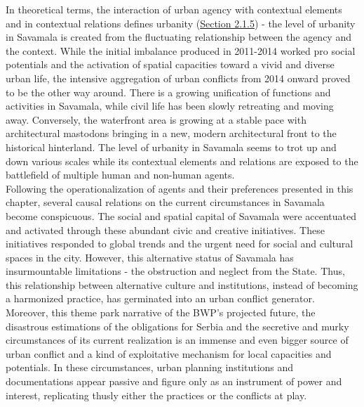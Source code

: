 \documentclass[11pt]{report}
\begin{document}
{{{{In theoretical terms, the interaction of urban agency with contextual elements and in contextual relations defines urbanity (\href{Section 2.1.5}{Section 2.1.5}) - the level of urbanity in Savamala is created from the fluctuating relationship between the agency and the context. While the initial imbalance produced in 2011-2014 worked pro social potentials and the activation of spatial capacities toward a vivid and diverse urban life, the intensive aggregation of urban conflicts from 2014 onward proved to be the other way around. There is a growing unification of functions and activities in Savamala, while civil life has been slowly retreating and moving away. Conversely, the waterfront area is growing at a stable pace with architectural mastodons bringing in a new, modern architectural front to the historical hinterland. The level of urbanity in Savamala seems to trot up and down various scales while its contextual elements and relations are exposed to the battlefield of multiple human and non-human agents.
\\

Following the operationalization of agents and their preferences presented in this chapter, several causal relations on the current circumstances in Savamala become conspicuous.
The social and spatial capital of Savamala were accentuated and activated through these abundant civic and creative initiatives.
These initiatives responded to global trends and the urgent need for social and cultural spaces in the city.
However, this alternative status of Savamala has insurmountable limitations - the obstruction and neglect from the State.
Thus, this relationship between alternative culture and institutions, instead of becoming a harmonized practice, has germinated into an urban conflict generator.
\\

Moreover, this theme park narrative of the BWP's projected future, the disastrous estimations of the obligations for Serbia and the secretive and murky circumstances of its current realization is an immense and even bigger source of urban conflict and a kind of exploitative mechanism for local capacities and potentials.
In these circumstances, urban planning institutions and documentations appear passive and figure only as an instrument of power and interest, replicating thusly either the practices or the conflicts at play.
\\

}}}}
\end{document}
